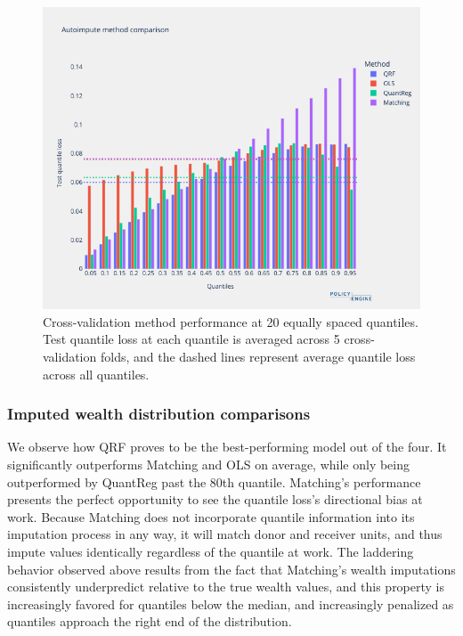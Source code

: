 \begin{figure}[h]
    \centering
    \includegraphics[width=\textwidth]{figures/quantile_loss_comparison.png}
    \caption{Cross-validation method performance at 20 equally spaced quantiles. Test quantile loss at each quantile is averaged across 5 cross-validation folds, and the dashed lines represent average quantile loss across all quantiles.}
    \label{fig:quantile_loss_comparison}
\end{figure}

\subsubsection{Imputed wealth distribution comparisons}

We observe how QRF proves to be the best-performing model out of the four. It significantly outperforms Matching and OLS on average, while only being outperformed by QuantReg past the 80th quantile. Matching's performance presents the perfect opportunity to see the quantile loss's directional bias at work. Because Matching does not incorporate quantile information into its imputation process in any way, it will match donor and receiver units, and thus impute values identically regardless of the quantile at work. The laddering behavior observed above results from the fact that Matching's wealth imputations consistently underpredict relative to the true wealth values, and this property is increasingly favored for quantiles below the median, and increasingly penalized as quantiles approach the right end of the distribution. 

